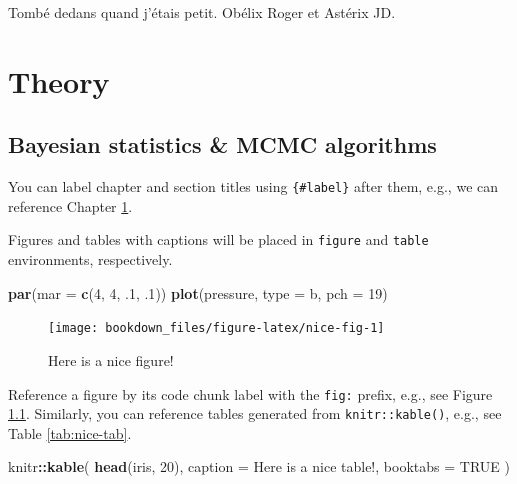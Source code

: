 \documentclass[
  12pt,
]{krantz}
\newenvironment{Shaded}{\begin{snugshade}}{\end{snugshade}}
\newcommand{\DataTypeTok}[1]{\textcolor[rgb]{0.13,0.29,0.53}{#1}}
\newcommand{\DecValTok}[1]{\textcolor[rgb]{0.00,0.00,0.81}{#1}}
\newcommand{\FloatTok}[1]{\textcolor[rgb]{0.00,0.00,0.81}{#1}}
\newcommand{\KeywordTok}[1]{\textcolor[rgb]{0.13,0.29,0.53}{\textbf{#1}}}
\newcommand{\NormalTok}[1]{#1}
\newcommand{\OperatorTok}[1]{\textcolor[rgb]{0.81,0.36,0.00}{\textbf{#1}}}
\newcommand{\OtherTok}[1]{\textcolor[rgb]{0.56,0.35,0.01}{#1}}
\newcommand{\StringTok}[1]{\textcolor[rgb]{0.31,0.60,0.02}{#1}}
\begin{document}
Tombé dedans quand j'étais petit. Obélix Roger et Astérix JD.

\mainmatter

\hypertarget{part-theory}{%
\part{Theory}\label{part-theory}}

\hypertarget{crashcourse}{%
\chapter{Bayesian statistics \& MCMC algorithms}\label{crashcourse}}

You can label chapter and section titles using \texttt{\{\#label\}} after them, e.g., we can reference Chapter \ref{crashcourse}.

Figures and tables with captions will be placed in \texttt{figure} and \texttt{table} environments, respectively.

\begin{Shaded}
\begin{Highlighting}[]
\KeywordTok{par}\NormalTok{(}\DataTypeTok{mar =} \KeywordTok{c}\NormalTok{(}\DecValTok{4}\NormalTok{, }\DecValTok{4}\NormalTok{, }\FloatTok{.1}\NormalTok{, }\FloatTok{.1}\NormalTok{))}
\KeywordTok{plot}\NormalTok{(pressure, }\DataTypeTok{type =} \StringTok{\textquotesingle{}b\textquotesingle{}}\NormalTok{, }\DataTypeTok{pch =} \DecValTok{19}\NormalTok{)}
\end{Highlighting}
\end{Shaded}

\begin{figure}

{\centering \texttt{[image: bookdown\_files/figure-latex/nice-fig-1]} 

}

\caption{Here is a nice figure!}\label{fig:nice-fig}
\end{figure}

Reference a figure by its code chunk label with the \texttt{fig:} prefix, e.g., see Figure \ref{fig:nice-fig}. Similarly, you can reference tables generated from \texttt{knitr::kable()}, e.g., see Table \ref{tab:nice-tab}.

\begin{Shaded}
\begin{Highlighting}[]
\NormalTok{knitr}\OperatorTok{::}\KeywordTok{kable}\NormalTok{(}
  \KeywordTok{head}\NormalTok{(iris, }\DecValTok{20}\NormalTok{), }\DataTypeTok{caption =} \StringTok{\textquotesingle{}Here is a nice table!\textquotesingle{}}\NormalTok{,}
  \DataTypeTok{booktabs =} \OtherTok{TRUE}
\NormalTok{)}
\end{Highlighting}
\end{Shaded}
\end{document}
